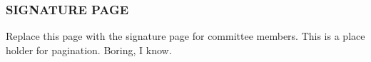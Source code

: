 
\begin{center}
\subsubsection*{SIGNATURE PAGE}
Replace this page with the signature page for committee members.  This is a place holder for pagination. Boring, I know.
\end{center}
\newpage
